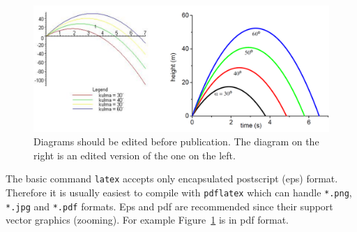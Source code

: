 \documentclass[12pt,a4paper,finnish]{tutthesis}
\begin{document}


\begin{figure}[t]
  \begin{center}
    \includegraphics[width=1.0\textwidth]{exampleFig}
  \end{center}
  \caption[Diagrams should be edited before publication.]{Diagrams
    should be edited before publication. The diagram on the right is
    an edited version of the one on the left.}
  \label{fig:ex_fig}
\end{figure}




The basic command \texttt{latex} accepts only encapsulated postscript
(eps) format. Therefore it is usually easiest to compile with
\texttt{pdflatex} which can handle \verb+*.png+, \verb+*.jpg+ and
\verb+*.pdf+ formats. Eps and pdf are recommended since their support
vector graphics (zooming). For example Figure~\ref{fig:ex_fig} is in
pdf format. 
\end{document}
